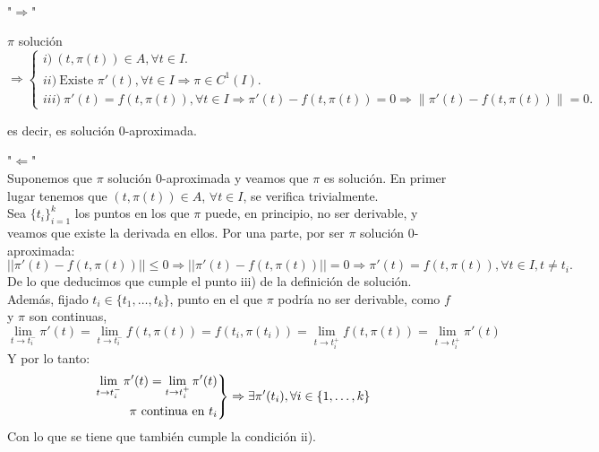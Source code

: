 \documentclass[11pt]{article}
\makeatletter
\theoremstyle{theorem-style}  %
\renewenvironment{proof}[1][\proofname]{\par
	\pushQED{\qed}%
	\normalfont \topsep6\p@\@plus6\p@\relax
	\list{}{%
		\settowidth{\leftmargin}{\quad:\hskip\labelsep}%
		\setlength{\labelwidth}{0pt}%
		\setlength{\itemindent}{-\leftmargin}%
	}%
	\item[\hskip\labelsep\itshape#1\@addpunct{:}]\ignorespaces
}{%
	\popQED\endlist\@endpefalse
}
\theoremstyle{definition-style}
\theoremstyle{example-style}
\providecommand{\norm}[1]{\left\lVert#1\right\rVert} %
\newenvironment{rcases}
{\left.\begin{aligned}}
	{\end{aligned}\right\rbrace}
\makeatother
\begin{document}
\begin{proof}\ \\
	"$ \Rightarrow $"
	
	$ \pi $	solución $\Rightarrow \begin{cases}
	i)\  (t, \pi (t)) \in A, \forall t \in I.\\
	ii)\  \text{Existe }  \pi' (t), \forall t \in I \Rightarrow \pi \in C^1(I). \\
	iii)\  \pi'(t)=f(t, \pi(t)),  \forall t \in I \Rightarrow \pi'(t)-f(t, \pi(t))=0 \Rightarrow \norm{\pi'(t)-f(t, \pi(t))}=0.
	\end{cases}$ 
	
	es decir, es solución 0-aproximada.
	
	"$ \Leftarrow $" \\Suponemos que $ \pi $ solución 0-aproximada y veamos que $ \pi $ es solución. En primer lugar tenemos que $(t, \pi (t)) \in A$, $\forall t \in I$, se verifica trivialmente. \\
	Sea $ \{t_i\}_{i=1}^k $ los puntos en los que $ \pi $ puede, en principio, no ser derivable, y veamos que existe la derivada en ellos. Por una parte, por ser  $ \pi $ solución 0-aproximada:
	 \[ ||\pi'(t)-f(t,\pi(t))||\leq 0\Rightarrow ||\pi'(t)-f(t,\pi(t))||=0 \Rightarrow \pi'(t)=f(t, \pi(t)), \forall t \in I, t\neq t_i.\]
	De lo que deducimos que cumple el punto iii) de la definición de solución. Además, fijado $ t_i\in \{t_1, \dots, t_k\} $, punto en el que $ \pi $ podría no ser derivable, como $ f $ y $ \pi $ son continuas, 
	\[ \lim\limits_{t\rightarrow t_i^-}\pi'(t)=\lim\limits_{t\rightarrow t_i^-} f(t, \pi(t))= f(t_i, \pi(t_i))= \lim\limits_{t\rightarrow t_i^+} f(t, \pi(t))=\lim\limits_{t\rightarrow t_i^+}\pi'(t)\]
	Y por lo tanto:
	\[ \begin{rcases}
	\lim\limits_{t\rightarrow t_i^-}\pi'(t)=\lim\limits_{t\rightarrow t_i^+}\pi'(t) \\
	\pi \text{ continua en } t_i
	\end{rcases}\Rightarrow \exists \pi'(t_i), \forall i \in \{1,\dots,k \} \]
	Con lo que se tiene que también cumple la condición ii).	
\end{proof}
\end{document}
